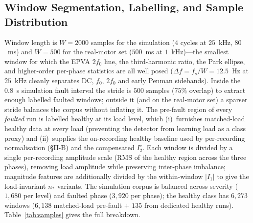 \documentclass[journal]{IEEEtran}
\begin{document}
\subsection{Window Segmentation, Labelling, and Sample Distribution}
\label{sec:samples}
Window length is $W = 2000$ samples for the simulation ($4$ cycles at $25$~kHz, $80$~ms)
and $W = 500$ for the real-motor set ($500$~ms at $1$~kHz)---the smallest window for which
the EPVA $2f_0$ line, the third-harmonic ratio, the Park ellipse, and higher-order
per-phase statistics are all well posed ($\Delta f = f_s / W = 12.5$~Hz at $25$~kHz cleanly
separates DC, $f_0$, $2f_0$ and early Penman sidebands). Inside the $0.8$~s simulation
fault interval the stride is $500$ samples ($75\%$ overlap) to extract enough labelled
faulted windows; outside it (and on the real-motor set) a sparser stride balances the
corpus without inflating it. The pre-fault region of every \emph{faulted} run is labelled
healthy at its load level, which (i)~furnishes matched-load healthy data at every load
(preventing the detector from learning load as a class proxy) and (ii)~supplies the
on-recording healthy baseline used by per-recording normalisation (\S II-B) and the
compensated $I_2^c$. Each window is divided by a single per-recording amplitude scale
(RMS of the healthy region across the three phases), removing load amplitude while
preserving inter-phase imbalance; magnitude features are additionally divided by the
within-window $|I_1|$ to give the load-invariant $n_{\!*}$ variants. The simulation corpus
is balanced across severity ($1{,}680$ per level) and faulted phase ($3{,}920$ per phase);
the healthy class has $6{,}273$ windows ($6{,}138$ matched-load pre-fault $+$ $135$ from
dedicated healthy runs). Table~\ref{tab:samples} gives the full breakdown.
\end{document}
